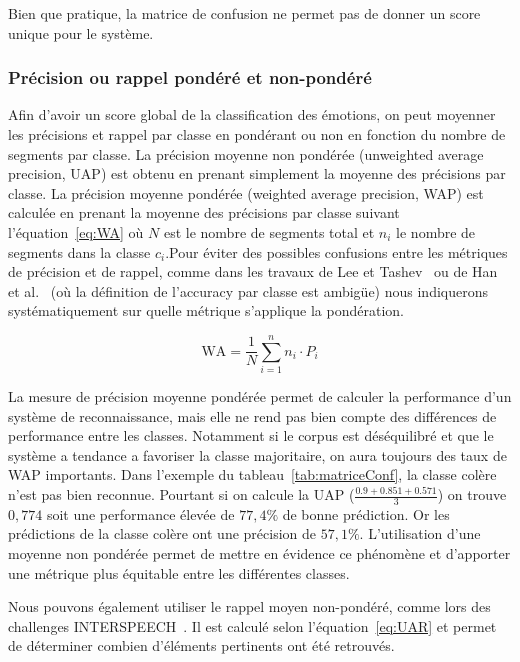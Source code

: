 Bien que pratique, la matrice de confusion ne permet pas de donner un score unique pour le système.


\subsubsection{Précision ou rappel pondéré et non-pondéré}

Afin d'avoir un score global de la classification des émotions, on
peut moyenner les précisions et rappel par classe en pondérant ou non en fonction du nombre de segments par classe.
La précision moyenne non pondérée  (unweighted average precision, UAP) est obtenu en prenant simplement la moyenne des précisions par classe.
La précision moyenne pondérée (weighted average precision, WAP) est calculée en prenant la moyenne des précisions par classe suivant l'équation~\ref{eq:WA} où $N$ est le nombre de segments total et $n_i$ le nombre de segments dans la classe $c_i$.Pour éviter des possibles confusions entre les métriques de précision et de rappel, comme dans les travaux de Lee et Tashev~\cite{Lee2015} ou de Han et al.~\cite{Han2014} (où la définition de l'accuracy par classe est ambigüe) nous indiquerons systématiquement sur quelle métrique s'applique la pondération.


\begin{equation}
  \text{WA} = \dfrac{1}{N}\sum^n_{i=1}n_i \cdot P_i
  \label{eq:WA}
\end{equation}

La mesure de précision moyenne pondérée permet de calculer la performance d'un système de reconnaissance, mais elle ne rend pas bien compte des différences de performance entre les classes. Notamment si le corpus est déséquilibré et que le système a tendance a favoriser la classe majoritaire, on aura toujours des taux de WAP importants. Dans l'exemple du tableau~\ref{tab:matriceConf}, la classe colère n'est pas bien reconnue. Pourtant si on calcule la UAP ($\frac{0.9+0.851+0.571}{3}$) on trouve $0,774$ soit une performance élevée de $77,4\%$ de bonne prédiction. Or les prédictions de la classe colère ont une précision de $57,1\%$. L'utilisation d'une moyenne non pondérée permet de mettre en évidence ce phénomène et d'apporter une métrique plus équitable entre les différentes classes.

Nous pouvons également utiliser le rappel moyen non-pondéré, comme lors des challenges INTERSPEECH~\cite{Schuller2009,Schuller2011}. Il est calculé selon l'équation~\ref{eq:UAR} et permet de déterminer combien d'éléments pertinents ont été retrouvés.

